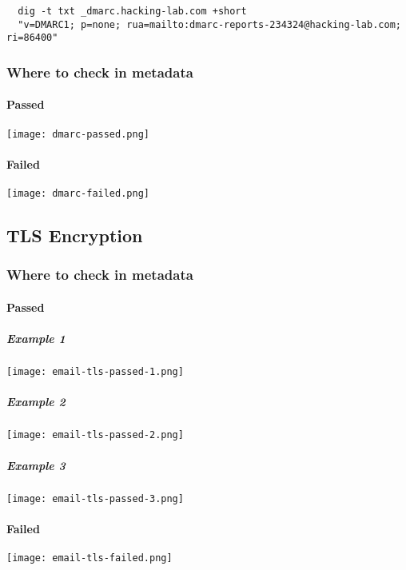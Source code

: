 \begin{lstlisting}
  dig -t txt _dmarc.hacking-lab.com +short
  "v=DMARC1; p=none; rua=mailto:dmarc-reports-234324@hacking-lab.com; ri=86400"
\end{lstlisting}

\subsubsection{Where to check in metadata}
\paragraph{Passed}
\texttt{[image: dmarc-passed.png]}

\paragraph{Failed}
\texttt{[image: dmarc-failed.png]}

\subsection{TLS Encryption}
\subsubsection{Where to check in metadata}
\paragraph{Passed}
\subparagraph{Example 1}
\texttt{[image: email-tls-passed-1.png]}
\subparagraph{Example 2}
\texttt{[image: email-tls-passed-2.png]}
\subparagraph{Example 3}
\texttt{[image: email-tls-passed-3.png]}

\paragraph{Failed}
\texttt{[image: email-tls-failed.png]}